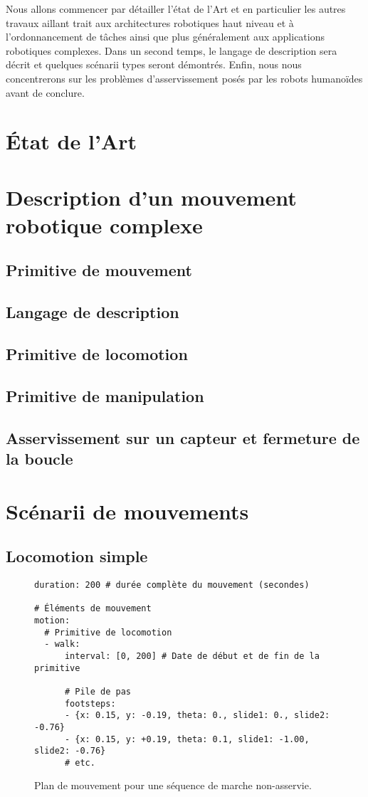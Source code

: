 Nous allons commencer par détailler l'état de l'Art et en particulier
les autres travaux aillant trait aux architectures robotiques haut
niveau et à l'ordonnancement de tâches ainsi que plus généralement aux
applications robotiques complexes. Dans un second temps, le langage de
description sera décrit et quelques scénarii types seront
démontrés. Enfin, nous nous concentrerons sur les problèmes
d'asservissement posés par les robots humanoïdes avant de conclure.


\section{\'Etat de l'Art}

\section{Description d'un mouvement robotique complexe}
\subsection{Primitive de mouvement}
\subsection{Langage de description}
\subsection{Primitive de locomotion}
\subsection{Primitive de manipulation}
\subsection{Asservissement sur un capteur et fermeture de la boucle}

\section{Scénarii de mouvements}
\subsection{Locomotion simple}

\begin{figure}
  \begin{center}
\begin{verbatim}
duration: 200 # durée complète du mouvement (secondes)

# Éléments de mouvement
motion:
  # Primitive de locomotion
  - walk:
      interval: [0, 200] # Date de début et de fin de la primitive

      # Pile de pas
      footsteps:
      - {x: 0.15, y: -0.19, theta: 0., slide1: 0., slide2: -0.76}
      - {x: 0.15, y: +0.19, theta: 0.1, slide1: -1.00, slide2: -0.76}
      # etc.
\end{verbatim}
  \end{center}
  \caption{Plan de mouvement pour une séquence de marche non-asservie.}
\end{figure}

